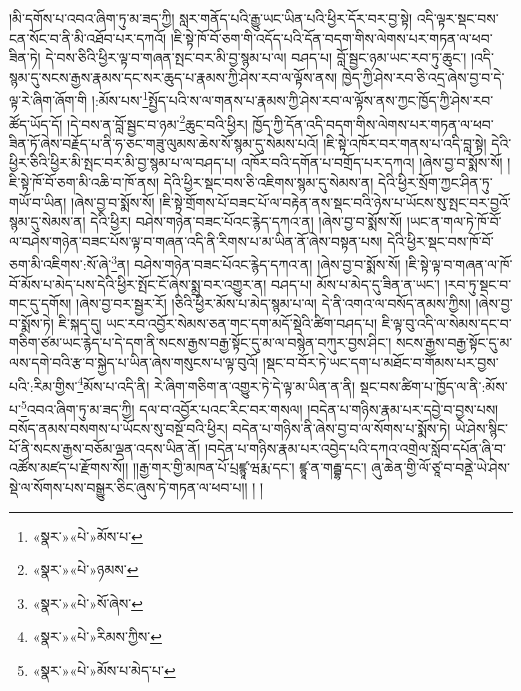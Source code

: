 །མི་དགོས་པ་འབའ་ཞིག་ཏུ་མ་ཟད་ཀྱི། སླར་གནོད་པའི་རྒྱུ་ཡང་ཡིན་པའི་ཕྱིར་དོར་བར་བྱ་སྟེ། འདི་ལྟར་སྡང་བས་ངན་སོང་བ་ནི་མི་འཐོབ་པར་དཀའོ། །ཇི་སྟེ་ཁོ་བོ་ཅག་གི་འདོད་པའི་དོན་བདག་གིས་ལེགས་པར་གཏན་ལ་ཕབ་ཟིན་ཏེ། དེ་བས་ཅིའི་ཕྱིར་ལྟ་བ་གཞན་སྤང་བར་མི་བྱ་སྙམ་པ་ལ། བཤད་པ། བློ་སྦྱང་ཉམ་ཡང་རབ་ཏུ་ཆུང་། །འདི་སྙམ་དུ་སངས་རྒྱས་རྣམས་དང་སར་ཆུད་པ་རྣམས་ཀྱི་ཤེས་རབ་ལ་ལྟོས་ནས། ཁྱེད་ཀྱི་ཤེས་རབ་ཅི་འདྲ་ཞེས་བྱ་བ་དེ་ལྟ་རེ་ཞིག་ཞོག་གི །:མོས་པས་\footnote{«སྣར་»«པེ་»མོས་པ་}སྤྱོད་པའི་ས་ལ་གནས་པ་རྣམས་ཀྱི་ཤེས་རབ་ལ་ལྟོས་ནས་ཀྱང་ཁྱོད་ཀྱི་ཤེས་རབ་ཚོད་ཡོད་དོ། །དེ་བས་ན་བློ་སྦྱང་བ་ཉམ་\footnote{«སྣར་»«པེ་»ཉམས་}ཆུང་བའི་ཕྱིར། ཁྱོད་ཀྱི་དོན་འདི་བདག་གིས་ལེགས་པར་གཏན་ལ་ཕབ་ཟིན་ཏོ་ཞེས་བརྗོད་པ་ནི་ཧ་ཅང་གཟུ་ལུམས་ཆེས་སོ་སྙམ་དུ་སེམས་པའོ། །ཇི་སྟེ་འཁོར་བར་གནས་པ་འདི་བླ་སྟེ། དེའི་ཕྱིར་ཅིའི་ཕྱིར་མི་སྤང་བར་མི་བྱ་སྙམ་པ་ལ་བཤད་པ། འཁོར་བའི་དགོན་པ་བགྲོད་པར་དཀའ། །ཞེས་བྱ་བ་སྨོས་སོ། །ཇི་སྟེ་ཁོ་བོ་ཅག་མི་འཆི་བ་ཁོ་ནས། དེའི་ཕྱིར་སྡང་བས་ཅི་འཇིགས་སྙམ་དུ་སེམས་ན། དེའི་ཕྱིར་སྲོག་ཀྱང་ཤིན་ཏུ་གཡོ་བ་ཡིན། །ཞེས་བྱ་བ་སྨོས་སོ། །ཇི་སྟེ་གྲོགས་པོ་བཟང་པོ་ལ་བརྟེན་ནས་སྡང་བའི་ཉེས་པ་ཡོངས་སུ་སྤང་བར་བྱའོ་སྙམ་དུ་སེམས་ན། དེའི་ཕྱིར། བཤེས་གཉེན་བཟང་པོའང་རྙེད་དཀའ་ན། །ཞེས་བྱ་བ་སྨོས་སོ། །ཡང་ན་གལ་ཏེ་ཁོ་བོ་ལ་བཤེས་གཉེན་བཟང་པོས་ལྟ་བ་གཞན་འདི་ནི་རིགས་པ་མ་ཡིན་ནོ་ཞེས་བསྟན་པས། དེའི་ཕྱིར་སྡང་བས་ཁོ་བོ་ཅག་མི་འཇིགས་:སོ་ཞེ་\footnote{«སྣར་»«པེ་»སོ་ཞེས་}ན། བཤེས་གཉེན་བཟང་པོའང་རྙེད་དཀའ་ན། །ཞེས་བྱ་བ་སྨོས་སོ། །ཇི་སྟེ་ལྟ་བ་གཞན་ལ་ཁོ་བོ་མོས་པ་མེད་པས་དེའི་ཕྱིར་སྤོང་ངོ་ཞེས་སྨྲ་བར་འགྱུར་ན། བཤད་པ། མོས་པ་མེད་དུ་ཟིན་ན་ཡང་། །རབ་ཏུ་སྡང་བ་གང་དུ་དགོས། །ཞེས་བྱ་བར་སྦྱར་རོ། །ཅིའི་ཕྱིར་མོས་པ་མེད་སྙམ་པ་ལ། དེ་ནི་འགའ་ལ་བསོད་ནམས་ཀྱིས། །ཞེས་བྱ་བ་སྨོས་ཏེ། ཇི་སྐད་དུ། ཡང་རབ་འབྱོར་སེམས་ཅན་གང་དག་མདོ་སྡེའི་ཚིག་བཤད་པ། ཇི་ལྟ་བུ་འདི་ལ་སེམས་དང་བ་གཅིག་ཙམ་ཡང་རྙེད་པ་དེ་དག་ནི་སངས་རྒྱས་བརྒྱ་སྟོང་དུ་མ་ལ་བསྙེན་བཀུར་བྱས་ཤིང་། སངས་རྒྱས་བརྒྱ་སྟོང་དུ་མ་ལས་དགེ་བའི་རྩ་བ་སྐྱེད་པ་ཡིན་ཞེས་གསུངས་པ་ལྟ་བུའོ། །སྡང་བ་བོར་ཏེ་ཡང་དག་པ་མཐོང་བ་གོམས་པར་བྱས་པའི་:རིམ་གྱིས་\footnote{«སྣར་»«པེ་»རིམས་ཀྱིས་}མོས་པ་འདི་ནི། རེ་ཞིག་གཅིག་ན་འགྱུར་ཏེ་དེ་ལྟ་མ་ཡིན་ན་ནི། སྡང་བས་ཚིག་པ་ཁྱོད་ལ་ནི་:མོས་པ་\footnote{«སྣར་»«པེ་»མོས་པ་མེད་པ་}འབའ་ཞིག་ཏུ་མ་ཟད་ཀྱི། དལ་བ་འབྱོར་པའང་རིང་བར་གསལ། །བདེན་པ་གཉིས་རྣམ་པར་དབྱེ་བ་བྱས་པས། བསོད་ནམས་བསགས་པ་ཡོངས་སུ་བསྔོ་བའི་ཕྱིར། བདེན་པ་གཉིས་ནི་ཞེས་བྱ་བ་ལ་སོགས་པ་སྨོས་ཏེ། ཡེ་ཤེས་སྙིང་པོ་ནི་སངས་རྒྱས་བཅོམ་ལྡན་འདས་ཡིན་ནོ། །བདེན་པ་གཉིས་རྣམ་པར་འབྱེད་པའི་དཀའ་འགྲེལ་སློབ་དཔོན་ཞི་བ་འཚོས་མཛད་པ་རྫོགས་སོ།། །།རྒྱ་གར་གྱི་མཁན་པོ་པྲཛྙཱ་ཝརྨ་དང་། ཛྙཱ་ན་གརྦྷ་དང་། ཞུ་ཆེན་གྱི་ལོ་ཙཱ་བ་བནྡེ་ཡེ་ཤེས་སྡེ་ལ་སོགས་པས་བསྒྱུར་ཅིང་ཞུས་ཏེ་གཏན་ལ་ཕབ་པ།། །
།